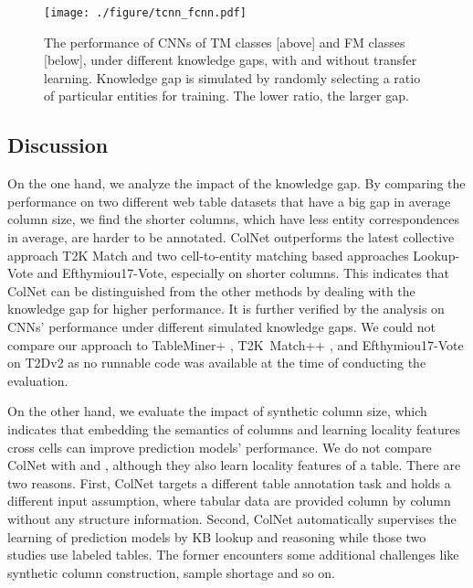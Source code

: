 \documentclass[letterpaper]{article}
\newcommand{\ernesto}[1]{{\color{black}#1}}
\newcommand{\rv}[1]{{\color{black}#1}}
\newcommand{\camera}[1]{{\color{black}#1}}
\newcommand{\ColNet}{\textsf{ColNet}\xspace}
\begin{document}
\begin{figure}[!t]
\centering
\texttt{[image: ./figure/tcnn\_fcnn.pdf]}
\caption{The performance of CNNs of TM classes [above] and FM classes [below], under different knowledge gaps, with and without transfer learning.
Knowledge gap is simulated by \rv{randomly selecting a ratio of} particular entities for training.
The lower ratio, the larger gap.
}
\label{fig:tcnn_fcnn}
\end{figure}


\subsection{Discussion}

On the one hand, \rv{we analyze the impact of the knowledge gap}.
By comparing the performance on two different web table datasets that have a big gap in average column size,
we find the shorter columns, \rv{which have less entity correspondences in average}, are harder to be annotated.
\ColNet outperforms the latest collective approach T2K Match and two cell-to-entity matching based approaches Lookup-Vote and Efthymiou17-Vote, 
especially on shorter columns.
This indicates that \ColNet can be distinguished from \rv{the other methods by dealing with the knowledge gap for higher performance.
It is further verified by the analysis on CNNs' performance under different simulated knowledge gaps.}
\ernesto{We could not compare our approach to TableMiner+ \cite{zhang2017effective}, T2K~Match++ \cite{ritze2017web}, and Efthymiou17-Vote on T2Dv2 \cite{efthymiou2017matching} as no runnable code was available at the time of conducting the evaluation.
}

On the other hand, we evaluate the impact of synthetic column size, 
which \camera{indicates}
that embedding the semantics of columns and learning locality features cross cells can improve prediction models' performance. 
We do not compare \ColNet with \cite{nishida2017understanding} and \cite{luo2018cross}, 
although they also learn locality features of \rv{a table}.
There are two reasons.
First, \ColNet targets a different table annotation task 
and holds a different input assumption, 
where tabular data are provided column by column \rv{without any structure information}.
Second, \ColNet automatically supervises the learning of prediction models by KB lookup and reasoning while those two studies use labeled tables.
The former encounters some additional challenges like synthetic column construction, sample shortage and so on.
\end{document}

